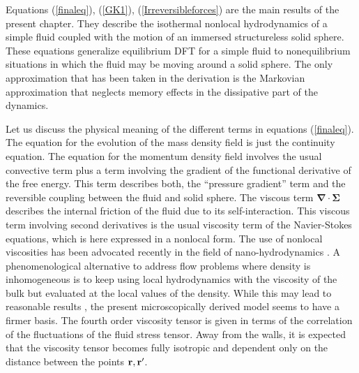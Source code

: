 \documentclass[b5paper,openright,10pt]{book}
\newcommand{\esc}{\!\cdot\!}
\begin{document}
Equations   (\ref{finaleq}), (\ref{GK1}),   (\ref{Irreversibleforces}) 
are the  main results of the present  chapter.  They describe
the isothermal nonlocal  hydrodynamics of a  simple fluid coupled with
the motion of an immersed structureless solid sphere.  These equations
generalize equilibrium DFT for a simple fluid to
nonequilibrium situations in  which the fluid may be  moving around a
solid  sphere.  The  only approximation  that  has been  taken in  the
derivation is the Markovian approximation that neglects memory effects
in the dissipative part of the dynamics.

Let  us  discuss  the  physical  meaning of  the  different  terms  in
equations  (\ref{finaleq}).  The  equation for  the evolution  of the  mass
density field is  just the continuity equation.  The  equation for the
momentum density field involves the  usual convective term plus a term
involving  the  gradient of  the  functional  derivative of  the  free
energy.  This term describes both,  the ``pressure gradient'' term and
the reversible coupling between the  fluid and solid sphere. The                viscous               term
$\boldsymbol{\nabla}\esc\boldsymbol{\Sigma}$  
describes   the  internal   friction   of  the   fluid   due  to   its
self-interaction.  This  viscous term involving second  derivatives is
the usual viscosity term of the Navier-Stokes equations, which is here
expressed in a  nonlocal form.  The use of  nonlocal viscosities has
been   advocated  recently   in   the   field  of   nano-hydrodynamics
\cite{Zhang2004,Hansen2007,Todd2008a,Hansen2011}.  A phenomenological
alternative to address flow problems where density is inhomogeneous is
to keep using  local hydrodynamics with the viscosity of  the bulk but
evaluated at the local values of the density\cite{Bitsanis1987}. While
this   may    lead   to    reasonable   results  
, the present  microscopically derived model seems
to have a firmer basis. The  fourth order viscosity tensor is given in
terms  of the  correlation of  the  fluctuations of  the fluid  stress
tensor.  Away from the walls, it is expected that the viscosity tensor
becomes fully isotropic and dependent only on the distance between the
points ${\bf r},{\bf r}'$.
\end{document}
